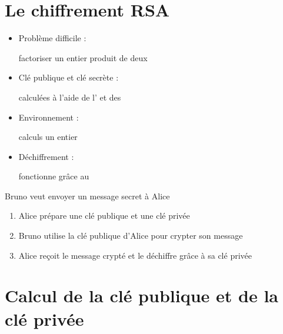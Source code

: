 \setcounter{framenumber}{0}


\section{Le chiffrement RSA}

\begin{frame}


\begin{itemize}
  \item Problème difficile : 

factoriser un entier produit de deux  
\pause
  \item Clé publique et clé secrète  :

calculées à l'aide de l' 
et des 
\pause
  \item Environnement :

calculs  un entier
\pause
  \item Déchiffrement :

fonctionne grâce au 
\end{itemize}

\bigskip
\pause

Bruno veut envoyer un message secret à Alice
\pause
\begin{enumerate}
  \item Alice prépare une clé publique et une clé privée
\pause  
  \item Bruno utilise la clé publique d'Alice pour crypter son message
\pause  
  \item Alice reçoit le message crypté et le déchiffre grâce à sa clé privée
\end{enumerate}
\end{frame}


\section{Calcul de la clé publique et de la clé privée}

